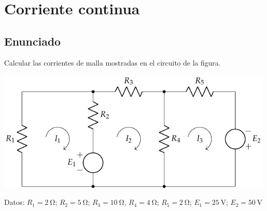 \chapter{Corriente continua}

\section{Enunciado}
Calcular las corrientes de malla mostradas en el circuito de la
figura.

\begin{center}
  \includegraphics{figuras/BT1_02.pdf}
\end{center}

  Datos: $R_1 = \qty{2}{\ohm}$; $R_2 = \qty{5}{\ohm}$; $R_3 = \qty{10}{\ohm}$, $R_4 = \qty{4}{\ohm}$; $R_5 = \qty{2}{\ohm}$; $E_1 = \qty{25}{\volt}$; $E_2 = \qty{50}{\volt}$

